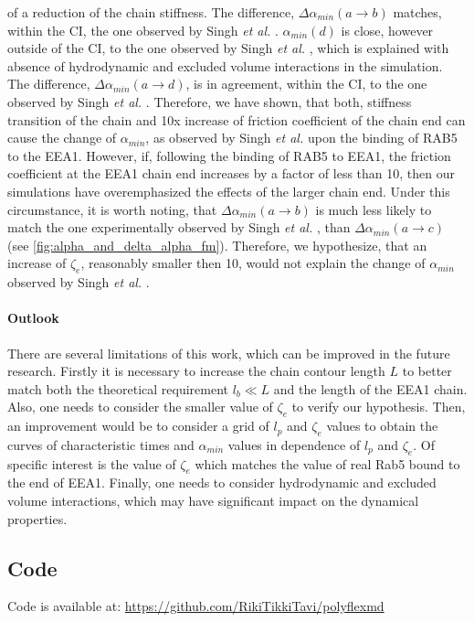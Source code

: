 \documentclass[
    paper=A4,pagesize=automedia,fontsize=12pt,
    BCOR=15mm,DIV=22,
    twoside,headinclude,footinclude=false,
    fleqn,             %
    bibliography=totocnumbered,          %
    listof=totoc,                %
    listof=flat,                 %
    cleardoublepage=empty      %
    numbers=endperiod
]{scrartcl}
\begin{document}
of a reduction of the chain stiffness.
The difference, $\Delta \alpha_{min}(a \rightarrow b)$ 
matches, within the CI, the one observed by Singh \emph{et al.} \cite{Singh:2022}.
$\alpha_{min}(d)$ is close, however outside of the CI, 
to the one observed by Singh \emph{et al.} \cite{Singh:2022}, 
which is explained with absence of hydrodynamic
and excluded volume interactions in the simulation. 
The difference, $\Delta \alpha_{min}(a \rightarrow d)$,
is in agreement, within the CI, to the one observed by Singh \emph{et al.} \cite{Singh:2022}.
Therefore, we have shown, that both, stiffness transition of the chain
and 10x increase of friction coefficient of the chain end can cause the change
of $\alpha_{min}$, as observed by Singh \emph{et al.} \cite{Singh:2022} 
upon the binding of RAB5 to the EEA1. However, if, following the binding of RAB5 to EEA1, 
the friction coefficient at the EEA1 chain end increases by a factor of less than 10, then   
our simulations have overemphasized the effects of the larger chain end. 
Under this circumstance, it is worth noting, that 
$\Delta \alpha_{min} (a \rightarrow b)$ is much less likely 
to match the one experimentally observed by Singh \emph{et al.} \cite{Singh:2022},  
than $\Delta \alpha_{min} (a \rightarrow c)$ (see \autoref{fig:alpha_and_delta_alpha_fm}). 
Therefore, we hypothesize, that an
increase of $\zeta_e$, reasonably smaller then 10, 
would not explain the change of $\alpha_{min}$ observed by
Singh \emph{et al.} \cite{Singh:2022}.



\paragraph{Outlook}
There are several limitations of this work, which can be improved in the future research.
Firstly it is necessary to increase the chain contour length $L$ to better match both the
theoretical requirement $l_b \ll L$ and the length of the EEA1 chain. Also, one needs to
consider the smaller value of $\zeta_e$ to verify our hypothesis. Then, an improvement 
would be to consider a grid of $l_p$ and $\zeta_e$ values to obtain the 
curves of characteristic times and $\alpha_{min}$ values in dependence of 
$l_p$ and $\zeta_e$. Of specific interest is the value of $\zeta_e$ which matches 
the value of real Rab5 bound to the end of EEA1. Finally, one needs to
consider hydrodynamic and excluded volume interactions, 
which may have significant impact on the dynamical properties.  

\clearpage
\begin{appendices}
    \section{Code}
    Code is available at: 
    \url{https://github.com/RikiTikkiTavi/polyflexmd} 
\end{appendices}
\end{document}
